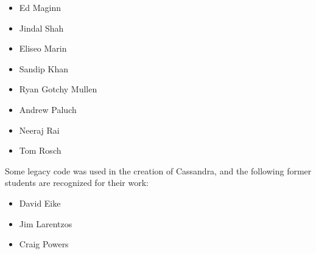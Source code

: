 \begin{itemize}

\item Ed Maginn
\item Jindal Shah
\item Eliseo Marin
\item Sandip Khan
\item Ryan Gotchy Mullen
\item Andrew Paluch
\item Neeraj Rai
\item Tom Rosch
\end{itemize}


Some legacy code was used in the creation of Cassandra, and the following former students are recognized for their work:

\begin{itemize}
\item David Eike
\item Jim Larentzos
\item Craig Powers
\end{itemize}
